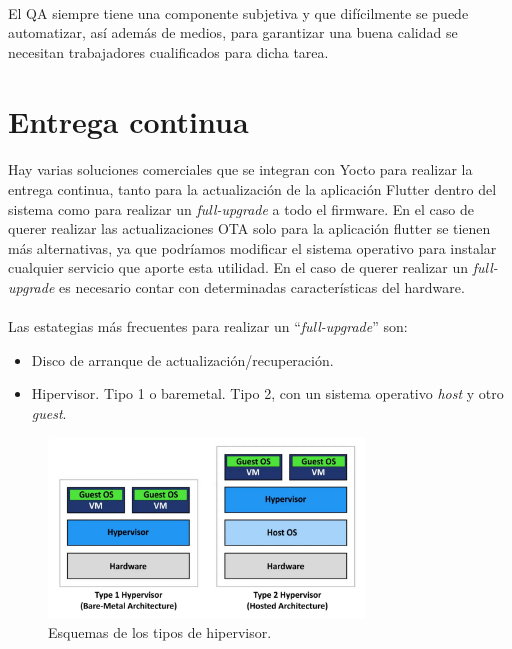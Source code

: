\paragraph{}El QA siempre tiene una componente subjetiva y que difícilmente se puede
automatizar, así además de medios, para garantizar una buena calidad se necesitan
trabajadores cualificados para dicha tarea.

\section{Entrega continua}

\paragraph{}Hay varias soluciones comerciales que se integran con Yocto para realizar
la entrega continua, tanto para la actualización de la aplicación Flutter dentro del
sistema como para realizar un \emph{full-upgrade} a todo el firmware. En el caso de
querer realizar las actualizaciones \gls{OTA} solo para la aplicación flutter se tienen
más alternativas, ya que podríamos modificar el sistema operativo para instalar cualquier
servicio que aporte esta utilidad. En el caso de querer realizar un \emph{full-upgrade}
es necesario contar con determinadas características del hardware.

\paragraph{}Las estategias más frecuentes para realizar un ``\emph{full-upgrade}'' son:
\begin{itemize}
    \item Disco de arranque de actualización/recuperación.
    \item Hipervisor.
        \subitem Tipo 1 o baremetal.
        \subitem Tipo 2, con un sistema operativo \emph{host} y otro \emph{guest}.
\end{itemize}

\begin{figure}[H]
    \centering
    \includegraphics[width=0.75\textwidth]{imgs/hypervisor}
    \caption{Esquemas de los tipos de hipervisor.}
    \label{imgs:hipervisor}
\end{figure}

